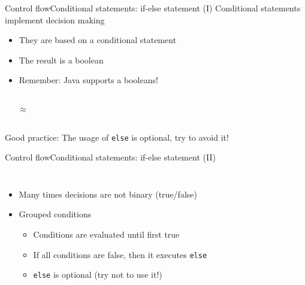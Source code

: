 \documentclass[10pt,compress]{beamer} %
\begin{document}
\begin{frame}{Control flow}{Conditional statements: if-else statement (I)}
	Conditional statements implement decision making
    \begin{itemize}
		\item They are based on a conditional statement
		\item The result is a boolean
		\item Remember: Java supports a booleans!
    \end{itemize}

	\vspace{-0.2cm}
    \begin{columns}
	\footnotesize{
		\begin{block}{}
		\vspace{-0.2cm}
		
		\vspace{-0.2cm}
		\end{block}
	}
		\Large{$\approx$}
	\footnotesize{
		\begin{block}{}
		\vspace{-0.2cm}
		
		\vspace{-0.2cm}
		\end{block}
	}
	\end{columns}
	\begin{center} Good practice: The usage of \texttt{else} is optional, try to avoid it! \end{center}
\end{frame}

\begin{frame}{Control flow}{Conditional statements: if-else statement (II)}
	\vspace{-0.2cm}
    \begin{columns}
		\begin{itemize}
		\item Many times decisions are not binary (true/false)
		\item Grouped conditions
			\begin{itemize}
			\item Conditions are evaluated until first true
			\item If all conditions are false, then it executes \texttt{else}
			\item \texttt{else} is optional (try not to use it!)
			\end{itemize}
	    \end{itemize}
		\begin{block}{}
		\vspace{-0.2cm}
		
		\vspace{-0.2cm}
		\end{block}
	\end{columns}
\end{frame}
\end{document}
